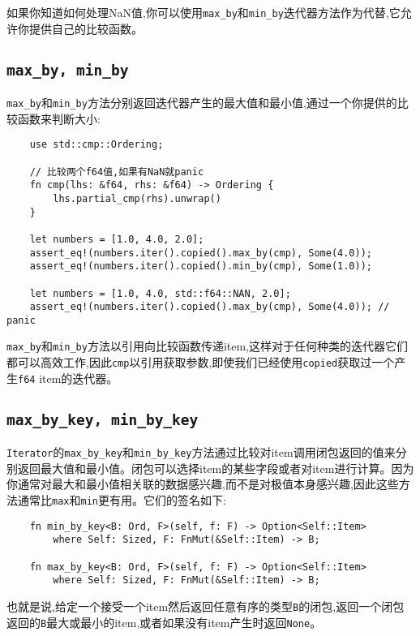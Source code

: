 如果你知道如何处理NaN值,你可以使用\texttt{max\_by}和\texttt{min\_by}迭代器方法作为代替,它允许你提供自己的比较函数。

\subsection{\texttt{max\_by, min\_by}}\label{MaxKey}
\texttt{max\_by}和\texttt{min\_by}方法分别返回迭代器产生的最大值和最小值,通过一个你提供的比较函数来判断大小:
\begin{verbatim}
    use std::cmp::Ordering;

    // 比较两个f64值,如果有NaN就panic
    fn cmp(lhs: &f64, rhs: &f64) -> Ordering {
        lhs.partial_cmp(rhs).unwrap()
    }
    
    let numbers = [1.0, 4.0, 2.0];
    assert_eq!(numbers.iter().copied().max_by(cmp), Some(4.0));
    assert_eq!(numbers.iter().copied().min_by(cmp), Some(1.0));

    let numbers = [1.0, 4.0, std::f64::NAN, 2.0];
    assert_eq!(numbers.iter().copied().max_by(cmp), Some(4.0)); // panic
\end{verbatim}

\texttt{max\_by}和\texttt{min\_by}方法以引用向比较函数传递item,这样对于任何种类的迭代器它们都可以高效工作,因此\texttt{cmp}以引用获取参数,即使我们已经使用\texttt{copied}获取过一个产生\texttt{f64} item的迭代器。

\subsection{\texttt{max\_by\_key, min\_by\_key}}
\texttt{Iterator}的\texttt{max\_by\_key}和\texttt{min\_by\_key}方法通过比较对item调用闭包返回的值来分别返回最大值和最小值。闭包可以选择item的某些字段或者对item进行计算。因为你通常对最大和最小值相关联的数据感兴趣,而不是对极值本身感兴趣,因此这些方法通常比\texttt{max}和\texttt{min}更有用。它们的签名如下:
\begin{verbatim}
    fn min_by_key<B: Ord, F>(self, f: F) -> Option<Self::Item>
        where Self: Sized, F: FnMut(&Self::Item) -> B;

    fn max_by_key<B: Ord, F>(self, f: F) -> Option<Self::Item>
        where Self: Sized, F: FnMut(&Self::Item) -> B;
\end{verbatim}

也就是说,给定一个接受一个item然后返回任意有序的类型\texttt{B}的闭包,返回一个闭包返回的\texttt{B}最大或最小的item,或者如果没有item产生时返回\texttt{None}。

